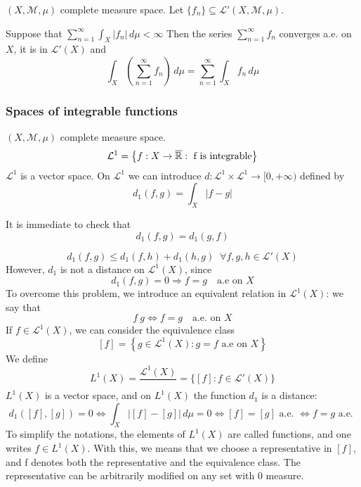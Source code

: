 \begin{proposition}
    \((X, \mathcal{M}, \mu)\) complete measure space. Let \(\{f_n\} \subseteq \mathcal{L}'(X, \mathcal{M}, \mu)\). 
    
    Suppose that \(\sum_{n=1}^\infty \int_X |f_n| \, d\mu < \infty\)
    Then the series \(\sum_{n=1}^\infty f_n\) converges a.e. on \(X\), it is in \(\mathcal{L}'(X)\) and 
    \[
        \int_X \left( \sum_{n=1}^\infty f_n  \right) \, d\mu = \sum_{n=1}^\infty \int_X f_n \, d\mu
    \]
\end{proposition}


\subsubsection*{Spaces of integrable functions}
\((X, \mathcal{M}, \mu)\) complete measure space.
\[
    \mathcal{L}^1 = \left\lbrace f: X \to \overline{\mathbb{R}} : \mbox{ f is integrable}\right\rbrace
\]
\(\mathcal{L}^1\) is a vector space. On \(\mathcal{L}^1\) we can introduce \(d : \mathcal{L}^1 \times \mathcal{L}^1 \to [0, +\infty)\) defined by 
\[
    d_1 (f,g) =\int_{X} \vert f-g \vert 
\]

It is immediate to check that 
\[
    d_1 (f, g) = d_1(g, f) \tag*{(symmetry)}
\]  

\[
    d_1(f, g) \leq d_1(f, h) + d_1(h, g) \; \;\forall f, g, h \in \mathcal{L}'(X) \tag*{(triangular inequality)}
\]  
However, \(d_1\) is not a distance on \(\mathcal{L}^1(X)\), since 
\[
    d_1(f,g) = 0 \Longrightarrow f=g \quad \mbox{a.e on }X
\tag*{(pseudo-distance)}\]
To overcome this problem, we introduce an equivalent relation in \(\mathcal{L}^1(X)\): we say that 
\[
    f ~ g \Longleftrightarrow f = g \quad \mbox{a.e. on }X
\]
If \(f \in \mathcal{L}^1(X)\), we can consider the equivalence class
\[
    [f] = \left\lbrace g \in \mathcal{L}^1(X) : g = f \mbox{ a.e on }X \right\rbrace
\]
We define
\[
    L^1(X) = \frac{\mathcal{L}^1(X)}{~} = \{[f]: f \in \mathcal{L}'(X)\}
\]
\(L^1(X)\) is a vector space, and on \(L^1(X)\) the function \(d_1\) is a distance: 
\[
    d_1([f], [g]) = 0 \iff \int_X |[f]-[g]|\, d\mu =0 \iff [f]= [g] \text{ a.e. } \iff f=g \text{ a.e. }
\]
To simplify the notations, the elements of \(L^1(X)\) are called functions, and one writes \(f \in L^1(X)\). With this, we means that we choose a representative in \([f]\), and f denotes both the representative and the equivalence class. The representative can be arbitrarily modified on any set with \(0\) measure.

